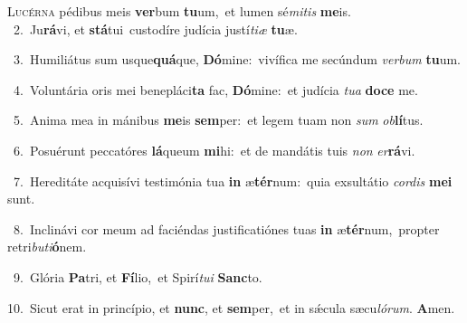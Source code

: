 \lettrine{\initial\textcolor{\initialcolor}{L}}{ucérna} pédibus meis \textbf{ver}\-bum \textbf{tu}\-um,~\star et lumen sé\-\textit{mi}\-\textit{tis} \textbf{me}\-is.\\
{\numbfont\textcolor{\numbcolor}{~2.}}~Ju\-\textbf{rá}\-vi, et \textbf{stá}\-tui~\star custodíre judícia justí\-\textit{ti}\-\textit{æ} \textbf{tu}\-æ.\par
{\numbfont\textcolor{\numbcolor}{~3.}}~Humiliátus sum usque\-\textbf{quá}\-que, \textbf{Dó}\-mine:~\star vivífica me secúndum \textit{ver}\-\textit{bum} \textbf{tu}\-um.\par
{\numbfont\textcolor{\numbcolor}{~4.}}~Voluntária oris mei benepláci\textbf{ta} fac, \textbf{Dó}\-mine:~\star et judícia \textit{tu}\-\textit{a} \textbf{do}\-\textbf{ce} me.\par
{\numbfont\textcolor{\numbcolor}{~5.}}~Anima mea in mánibus \textbf{me}\-is \textbf{sem}\-per:~\star et legem tuam non \textit{sum} \textit{ob}\-\textbf{lí}tus.\par
{\numbfont\textcolor{\numbcolor}{~6.}}~Posuérunt peccatóres \textbf{lá}\-queum \textbf{mi}\-hi:~\star et de mandátis tuis \textit{non} \textit{er}\-\textbf{rá}vi.\par
{\numbfont\textcolor{\numbcolor}{~7.}}~Hereditáte acquisívi testimónia tua \textbf{in} æ\-\textbf{tér}\-num:~\star quia exsultátio \textit{cor}\-\textit{dis} \textbf{me}\-\textbf{i} sunt.\par
{\numbfont\textcolor{\numbcolor}{~8.}}~Inclinávi cor meum ad faciéndas justificatiónes tuas \textbf{in} æ\-\textbf{tér}\-num,~\star propter retri\-\textit{bu}\-\textit{ti}\textbf{ó}nem.\par
{\numbfont\textcolor{\numbcolor}{~9.}}~Glória \textbf{Pa}\-tri, et \textbf{Fí}\-lio,~\star et Spirí\-\textit{tu}\-\textit{i} \textbf{Sanc}\-to.\par
{\numbfont\textcolor{\numbcolor}{10.}}~Sicut erat in princípio, et \textbf{nunc}\-, et \textbf{sem}\-per,~\star et in sǽcula sæcu\-\textit{ló}\-\textit{rum}. \textbf{A}\-men.\par
